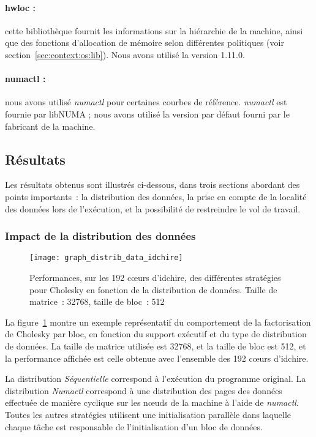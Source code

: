 \paragraph{hwloc :} cette bibliothèque fournit les informations sur la hiérarchie de la machine, ainsi que des fonctions d'allocation de mémoire selon différentes politiques (voir section~\ref{sec:context:os:lib}). Nous avons utilisé la version 1.11.0.

\paragraph{numactl :} nous avons utilisé \emph{numactl} pour certaines courbes de référence. \emph{numactl} est fournie par libNUMA ; nous avons utilisé la version par défaut fourni par le fabricant de la machine.


\subsection{Résultats}\label{sec:contribs:perf_eval:resultats}

Les résultats obtenus sont illustrés ci-dessous, dans trois sections abordant des points importants~: la distribution des données, la prise en compte de la localité des données lors de l'exécution, et la possibilité de restreindre le vol de travail.

\subsubsection{Impact de la distribution des données}

\begin{figure}[ht]
  \centering
  \texttt{[image: graph\_distrib\_data\_idchire]}
  \caption{Performances, sur les 192 cœurs d'idchire, des différentes stratégies pour Cholesky en fonction de la distribution de données. Taille de matrice~: 32768, taille de bloc~: 512}\label{fig:contribs:perf_eval:distrib-idchire}
\end{figure}


La figure~\ref{fig:contribs:perf_eval:distrib-idchire} montre un exemple représentatif du comportement de la factorisation de Cholesky par bloc, en fonction du support exécutif et du type de distribution de données. La taille de matrice utilisée est 32768, et la taille de bloc est 512, et la performance affichée est celle obtenue avec l'ensemble des 192 cœurs d'idchire.

La distribution \emph{Séquentielle} correspond à l'exécution du programme original.
La distribution \emph{Numactl} correspond à une distribution des pages des données effectuée de manière cyclique sur les nœuds de la machine à l'aide de \emph{numactl}.
Toutes les autres stratégies utilisent une initialisation parallèle dans laquelle chaque tâche est responsable de l'initialisation d'un bloc de données.


